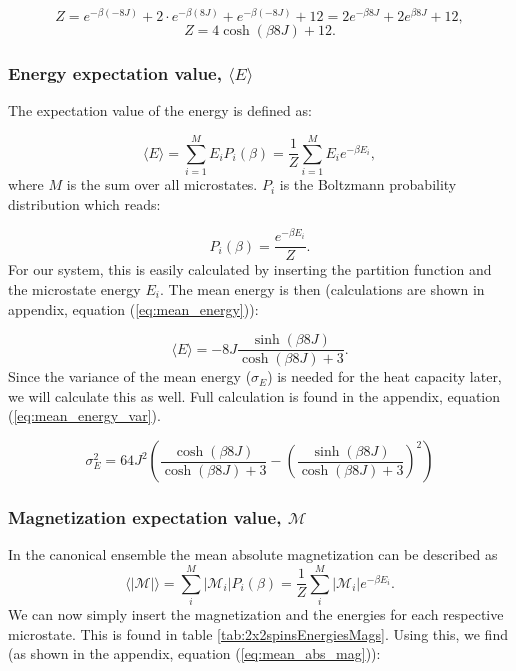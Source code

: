 \documentclass[../main.tex]{subfiles}
\begin{document}
\[Z = e^{-\beta (-8J)} + 2 \cdot e^{-\beta (8J)} + e^{-\beta (-8J)} + 12 = 2e^{-\beta 8J} + 2e^{\beta 8J} + 12,\]
\[Z = 4\cosh(\beta 8J) + 12.\]

\subsubsection*{Energy expectation value, $\langle E \rangle$}
The expectation value of the energy is defined as:

\[\langle E \rangle = \sum_{i=1}^M E_i P_i(\beta) = \frac{1}{Z}\sum_{i=1}^M E_i e^{-\beta E_i},\]
where $M$ is the sum over all microstates. $P_i$ is the Boltzmann probability distribution which reads:

\[P_i(\beta) = \frac{e^{-\beta E_i}}{Z}.\]
For our system, this is easily calculated by inserting the partition function and the microstate energy $E_i$. The mean energy is then (calculations are shown in appendix, equation (\ref{eq:mean_energy})):

\begin{equation*}
  \langle E \rangle = -8J\frac{\sinh(\beta 8 J)}{\cosh(\beta 8 J) + 3}.
\end{equation*}
Since the variance of the mean energy ($\sigma_E$) is needed for the heat capacity later, we will calculate this as well. Full calculation is found in the appendix, equation (\ref{eq:mean_energy_var}).

\begin{equation*}
  \sigma_E^2 = 64J^2\left(\frac{\cosh(\beta 8J)}{\cosh(\beta 8 J) + 3} - \left(\frac{\sinh(\beta 8 J)}{\cosh(\beta 8 J) + 3}\right)^2\right)
\end{equation*}

\subsubsection*{Magnetization expectation value, $\mathcal{M}$}
In the canonical ensemble the mean absolute magnetization can be described as
\[\langle |\mathcal{M}| \rangle = \sum_i^M |\mathcal{M}_i| P_i(\beta) = \frac{1}{Z} \sum_i^M |\mathcal{M}_i| e^{-\beta E_i}.\]
We can now simply insert the magnetization and the energies for each respective microstate. This is found in table \ref{tab:2x2spinsEnergiesMags}. Using this, we find (as shown in the appendix, equation (\ref{eq:mean_abs_mag})):
\end{document}
